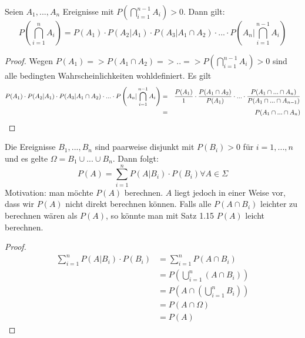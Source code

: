 \begin{proposition}[Multiplikationssatz]
Seien $A_1,...,A_n$ Ereignisse mit $P \left ( \bigcap\limits_{i=1}^{n-1} A_i \right ) > 0$. Dann gilt:
$$ P \left ( \bigcap\limits_{i=1}^{n} A_i \right ) = P(A_1) \cdot P(A_2 | A_1) \cdot P(A_3 | A_1 \cap A_2 ) \cdot ... \cdot P \left ( A_n | \bigcap\limits_{i=1}^{n-1} A_i \right ) $$
\end{proposition}
\begin{proof}
Wegen $P(A_1) => P( A_1 \cap A_2 ) => .. =>  P \left ( \bigcap\limits_{i=1}^{n-1} A_i \right ) > 0$ sind alle bedingten %
Wahrscheinlichkeiten wohldefiniert. Es gilt 
\begin{eqnarray*}
P(A_1) \cdot P(A_2 | A_1) \cdot P(A_3 | A_1 \cap A_2 ) \cdot ... \cdot P \left ( A_n | \bigcap\limits_{i=1}^{n-1} A_i \right ) & = & \frac{P(A_1)}{1} \cdot \frac{P(A_1 \cap A_2)}{P(A_1)} \cdot ... \cdot \frac{P(A_1 \cap ... \cap A_n)}{P(A_1 \cap ... \cap A_{n-1})}
\cr & = & P(A_1 \cap ... \cap A_n)
\end{eqnarray*}
\end{proof}
\begin{theorem}
Die Ereignisse $B_1,...,B_n$ sind paarweise disjunkt mit $P(B_i) > 0$ für $i=1,...,n$ und es gelte $\Omega = B_1 \cup ... \cup B_n$. %
Dann folgt:
$$ P(A) = \sum\limits_{i=1}^{n} P(A|B_i) \cdot P(B_i) \forall A \in \Sigma$$
Motivation: man möchte $P(A)$ berechnen. $A$ liegt jedoch in einer Weise vor, dass wir $P(A)$ nicht direkt berechnen können. %
Falls alle $P(A \cap B_i)$ leichter zu berechnen wären als $P(A)$, so könnte man mit Satz 1.15 $P(A)$ leicht berechnen.
\end{theorem}
\begin{proof}
\begin{align*}
\sum\limits_{i=1}^n P(A|B_i) \cdot P(B_i) & = \sum\limits_{i=1}^n P(A \cap B_i) \\ %
	& = P \left( \bigcup\limits_{i=1}^n ( A \cap B_i ) \right ) \\ %
	& = P \left( A \cap \left( \bigcup\limits_{i=1}^n B_i \right) \right ) \\ %
	& = P ( A \cap \Omega ) \\ %
	& = P(A)
\end{align*}
\end{proof}
